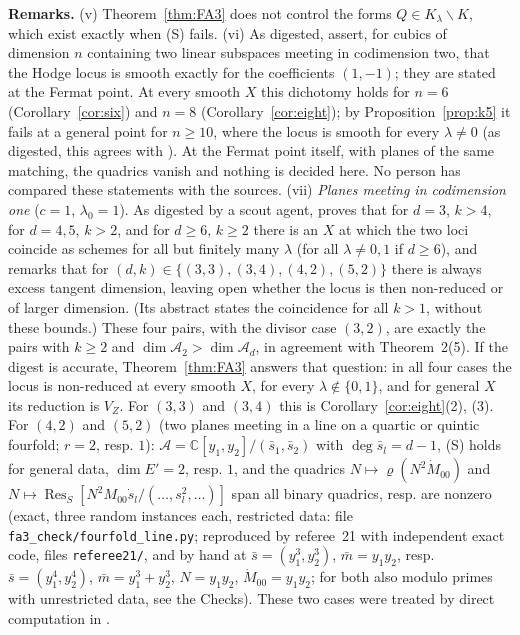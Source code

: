 \documentclass[11pt]{article}
\numberwithin{equation}{section}
\theoremstyle{remark}
\newcommand{\CC}{\mathbb{C}}
\newcommand{\VZ}{V_Z}
\newcommand{\cA}{\mathcal{A}}
\newcommand{\Res}{\operatorname{Res}}
\newcommand{\lz}{\lambda_0}
\newcommand{\run}[1]{\medskip\noindent\textbf{#1}}
\begin{document}
\run{Remarks.} (v) Theorem~\ref{thm:FA3} does not control the forms $Q\in K_\lambda\smallsetminus K$, which exist
exactly when (S) fails. (vi) As digested, \cite[Conj.~6, 7]{Mo} assert, for cubics of dimension $n$ containing
two linear subspaces meeting in codimension two, that the Hodge locus is smooth exactly for the coefficients
$(1,-1)$; they are stated at the Fermat point. At every smooth $X$ this dichotomy holds for $n=6$
(Corollary~\ref{cor:six}) and $n=8$ (Corollary~\ref{cor:eight}); by Proposition~\ref{prop:k5} it
fails at a general point for $n\ge10$, where the locus is smooth for every $\lambda\ne0$ (as digested, this
agrees with \cite[Thm.~1.2, 4.9]{Kl}). At the Fermat point itself, with planes of the same matching, the
quadrics vanish and nothing is decided here. No person has compared these statements with the sources.
(vii) \emph{Planes meeting in codimension one} ($c=1$, $\lz=1$). As digested by a scout agent, \cite{Kl2} proves
that for $d=3$, $k>4$, for $d=4,5$, $k>2$, and for $d\ge6$, $k\ge2$ there is an $X$ at which the two loci coincide
as schemes for all but finitely many $\lambda$ (for all $\lambda\ne0,1$ if $d\ge6$), and remarks
\cite[Remark~4.9]{Kl2} that for $(d,k)\in\{(3,3),(3,4),(4,2),(5,2)\}$ there is always excess tangent dimension,
leaving open whether the locus is then non-reduced or of larger dimension. (Its abstract states the coincidence
for all $k>1$, without these bounds.) These four pairs, with the divisor case $(3,2)$, are exactly the pairs
with $k\ge2$ and $\dim\cA_2>\dim\cA_d$, in agreement with Theorem~2(5). If the digest is accurate, Theorem~\ref{thm:FA3} answers that question:
in all four cases the locus is non-reduced at every smooth $X$, for every $\lambda\notin\{0,1\}$, and for
general $X$ its reduction is $\VZ$. For $(3,3)$ and $(3,4)$ this is Corollary~\ref{cor:eight}(2), (3). For
$(4,2)$ and $(5,2)$ (two planes meeting in a line on a quartic or quintic fourfold; $r=2$, resp. $1$):
$\cA=\CC[y_1,y_2]/(\bar s_1,\bar s_2)$ with $\deg\bar s_l=d-1$, (S) holds for general data, $\dim E'=2$, resp. $1$,
and the quadrics $N\mapsto\varrho(N^2\dot M_{00})$ and $N\mapsto\Res_S[N^2M_{00}\dot s_l/(\dots,s_l^2,\dots)]$ span all
binary quadrics, resp. are nonzero (exact, three random instances each, restricted data: file
\texttt{fa3\_check/fourfold\_line.py}; reproduced by referee~21 with independent exact code, files
\texttt{referee21/}, and by hand at $\bar s=(y_1^3,y_2^3)$, $\bar m=y_1y_2$, resp. $\bar s=(y_1^4,y_2^4)$,
$\bar m=y_1^3+y_2^3$, $N=y_1y_2$, $\dot M_{00}=y_1y_2$; for both also modulo primes with unrestricted data, see
the Checks). These two cases were treated by direct computation in \cite{P1}.
\end{document}
